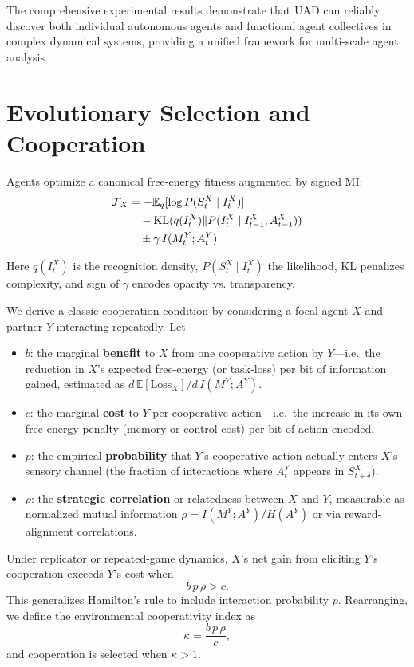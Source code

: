 \documentclass[10pt,conference]{IEEEtran}
\begin{document}
The comprehensive experimental results demonstrate that UAD can reliably discover both individual autonomous agents and functional agent collectives in complex dynamical systems, providing a unified framework for multi-scale agent analysis.

\section{Evolutionary Selection and Cooperation}
Agents optimize a canonical free‐energy fitness augmented by signed MI:
\begin{align}
\mathcal F_X &= -\mathbb{E}_q[\log P(S^X_t\mid I^X_t)] \notag \\
&\quad - \mathrm{KL}(q(I^X_t)\|P(I^X_t\mid I^X_{t-1},A^X_{t-1})) \notag \\
&\quad \pm\gamma\,I(M^Y_t;A^Y_t)
\end{align}

Here $q(I^X_t)$ is the recognition density, $P(S^X_t\mid I^X_t)$ the likelihood, KL penalizes complexity, and sign of $\gamma$ encodes opacity vs. transparency.

We derive a classic cooperation condition by considering a focal agent $X$ and partner $Y$ interacting repeatedly.  Let
\begin{itemize}
  \item \(b\): the marginal \textbf{benefit} to \(X\) from one cooperative action by \(Y\)—i.e.\ the reduction in \(X\)'s expected free‐energy (or task‐loss) per bit of information gained, estimated as \(d\,\mathbb{E}[\mathrm{Loss}_X]/d\,I(M^Y;A^Y)\).
  \item \(c\): the marginal \textbf{cost} to \(Y\) per cooperative action—i.e.\ the increase in its own free‐energy penalty (memory or control cost) per bit of action encoded.
  \item \(p\): the empirical \textbf{probability} that \(Y\)'s cooperative action actually enters \(X\)'s sensory channel (the fraction of interactions where \(A^Y_t\) appears in \(S^X_{t+\delta}\)).
  \item \(\rho\): the \textbf{strategic correlation} or relatedness between \(X\) and \(Y\), measurable as normalized mutual information \(\rho=I(M^Y;A^Y)/H(A^Y)\) or via reward‐alignment correlations.
\end{itemize}
Under replicator or repeated-game dynamics, $X$'s net gain from eliciting $Y$'s cooperation exceeds $Y$'s cost when
\[
b\,p\,\rho > c.
\]
This generalizes Hamilton's rule \cite{Hamilton1964} to include interaction probability $p$. Rearranging, we define the environmental cooperativity index as
\[
\kappa = \frac{b\,p\,\rho}{c},
\]
and cooperation is selected when $\kappa>1$.
\end{document}
